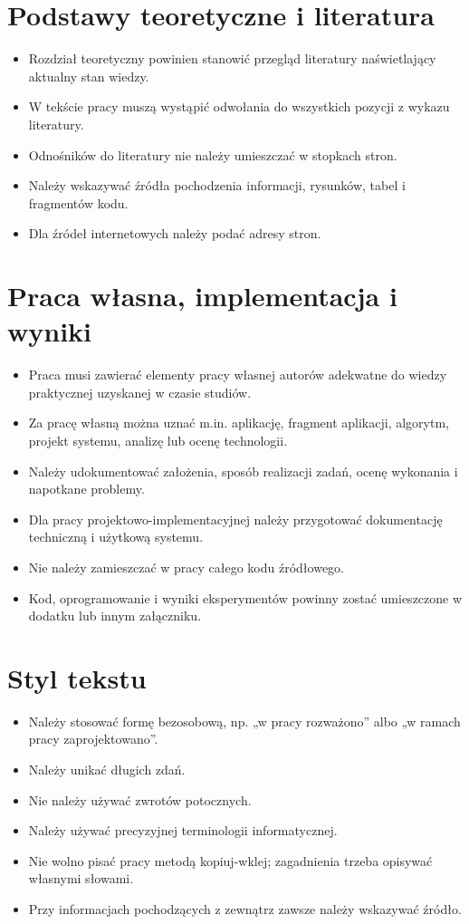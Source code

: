 \section*{Podstawy teoretyczne i literatura}
\begin{itemize}
    \item Rozdział teoretyczny powinien stanowić przegląd literatury naświetlający aktualny stan wiedzy.
    \item W tekście pracy muszą wystąpić odwołania do wszystkich pozycji z wykazu literatury.
    \item Odnośników do literatury nie należy umieszczać w stopkach stron.
    \item Należy wskazywać źródła pochodzenia informacji, rysunków, tabel i fragmentów kodu.
    \item Dla źródeł internetowych należy podać adresy stron.
\end{itemize}

\section*{Praca własna, implementacja i wyniki}
\begin{itemize}
    \item Praca musi zawierać elementy pracy własnej autorów adekwatne do wiedzy praktycznej uzyskanej w czasie studiów.
    \item Za pracę własną można uznać m.in. aplikację, fragment aplikacji, algorytm, projekt systemu, analizę lub ocenę technologii.
    \item Należy udokumentować założenia, sposób realizacji zadań, ocenę wykonania i napotkane problemy.
    \item Dla pracy projektowo-implementacyjnej należy przygotować dokumentację techniczną i użytkową systemu.
    \item Nie należy zamieszczać w pracy całego kodu źródłowego.
    \item Kod, oprogramowanie i wyniki eksperymentów powinny zostać umieszczone w dodatku lub innym załączniku.
\end{itemize}

\section*{Styl tekstu}
\begin{itemize}
    \item Należy stosować formę bezosobową, np. „w pracy rozważono” albo „w ramach pracy zaprojektowano”.
    \item Należy unikać długich zdań.
    \item Nie należy używać zwrotów potocznych.
    \item Należy używać precyzyjnej terminologii informatycznej.
    \item Nie wolno pisać pracy metodą kopiuj-wklej; zagadnienia trzeba opisywać własnymi słowami.
    \item Przy informacjach pochodzących z zewnątrz zawsze należy wskazywać źródło.
\end{itemize}

